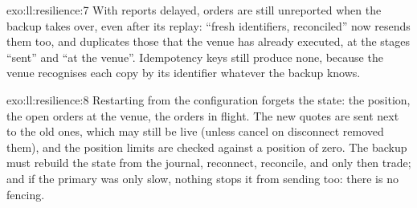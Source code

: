 \begin{solution}{exo:ll:resilience:7}
With reports delayed, orders are still unreported when the backup takes over, even after its replay: ``fresh identifiers,
reconciled'' now resends them too, and duplicates those that the venue has already executed, at the stages ``sent'' and ``at
the venue''. Idempotency keys still produce none, because the venue recognises each copy by its identifier whatever the
backup knows.
\end{solution}

\begin{solution}{exo:ll:resilience:8}
Restarting from the configuration forgets the state: the position, the open orders at the venue, the orders in flight. The new
quotes are sent next to the old ones, which may still be live (unless cancel on disconnect removed them), and the position
limits are checked against a position of zero. The backup must rebuild the state from the journal, reconnect, reconcile, and
only then trade; and if the primary was only slow, nothing stops it from sending too: there is no fencing.
\end{solution}

